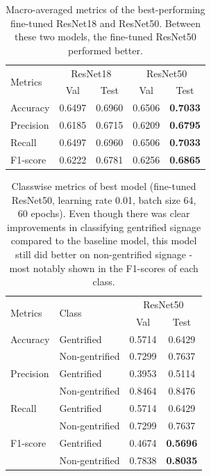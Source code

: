 \begin{table}[h]
    \begin{tabular}{lcc|cc}
\multirow{2}{*}{Metrics} & \multicolumn{2}{c|}{ResNet18} & \multicolumn{2}{c}{ResNet50} \\ \cline{2-5} 
                         & Val           & Test          & Val           & Test         \\ \hline
Accuracy                 & 0.6497        & 0.6960        & 0.6506        & \textbf{0.7033}       \\
Precision                & 0.6185        & 0.6715        & 0.6209        & \textbf{0.6795}       \\
Recall                   & 0.6497        & 0.6960        & 0.6506        & \textbf{0.7033}       \\
F1-score                 & 0.6222        & 0.6781        & 0.6256        & \textbf{0.6865}      
    \end{tabular}
    \caption{Macro-averaged metrics of the best-performing fine-tuned ResNet18 and ResNet50. Between these two models, the fine-tuned ResNet50 performed better.}
    \label{fig:resnet_compare}
\end{table}


\begin{table}[h]
\begin{tabular}{llcc}
\multirow{2}{*}{Metrics}   & \multirow{2}{*}{Class} & \multicolumn{2}{c}{ResNet50} \\ \cline{3-4} 
                           &                        & Val           & Test         \\ \hline
Accuracy                   & Gentrified             & 0.5714        & 0.6429       \\
                           & Non-gentrified         & 0.7299        & 0.7637       \\
Precision                  & Gentrified             & 0.3953        & 0.5114       \\
                           & Non-gentrified         & 0.8464        & 0.8476       \\
Recall                     & Gentrified             & 0.5714        & 0.6429       \\
                           & Non-gentrified         & 0.7299        & 0.7637       \\
F1-score                   & Gentrified             & 0.4674        & \textbf{0.5696}       \\
                           & Non-gentrified         & 0.7838        & \textbf{0.8035}      
\end{tabular}
\caption{Classwise metrics of best model (fine-tuned ResNet50, learning rate 0.01, batch size 64, 60 epochs). Even though there was clear improvements in classifying gentrified signage compared to the baseline model, this model still did better on non-gentrified signage - most notably shown in the F1-scores of each class.}
\label{fig:resnet50_cls}
\end{table}

